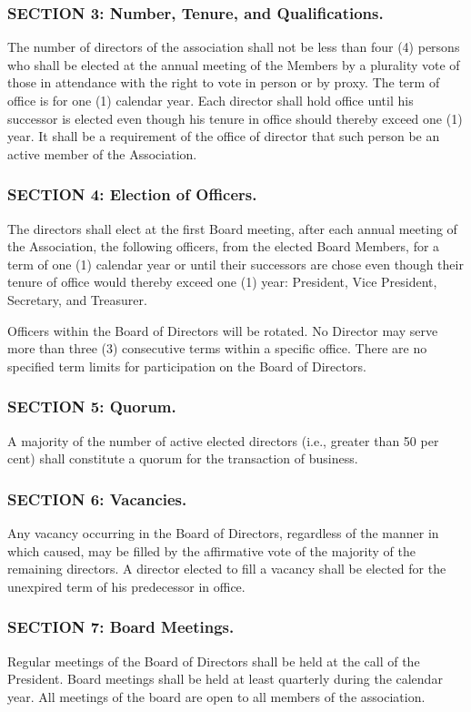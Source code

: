 \subsubsection{SECTION 3: Number, Tenure, and Qualifications.}
The number of directors of the association shall not be less than four
(4) persons who shall be elected at the annual meeting of the Members
by a plurality vote of those in attendance with the right to vote in
person or by proxy. The term of office is for one (1) calendar year. Each
director shall hold office until his successor is elected even though
his tenure in office should thereby exceed one (1) year. It shall be
a requirement of the office of director that such person be an active
member of the Association.

\subsubsection{SECTION 4: Election of Officers.}
The directors shall elect at the first Board meeting, after each annual
meeting of the Association, the following officers, from the elected Board
Members, for a term of one (1) calendar year or until their successors
are chose even though their tenure of office would thereby exceed one
(1) year: President, Vice President, Secretary, and Treasurer.

Officers within the Board of Directors will be rotated. No Director
may serve more than three (3) consecutive terms within a specific
office. There are no specified term limits for participation on the
Board of Directors.

\subsubsection{SECTION 5: Quorum.}
A majority of the number of active elected directors (i.e., greater than
50 per cent) shall constitute a quorum for the transaction of business.

\subsubsection{SECTION 6: Vacancies.}
Any vacancy occurring in the Board of Directors, regardless of the manner
in which caused, may be filled by the affirmative vote of the majority
of the remaining directors. A director elected to fill a vacancy shall
be elected for the unexpired term of his predecessor in office.

\subsubsection{SECTION 7: Board Meetings.}
Regular meetings of the Board of Directors shall be held at the call of
the President. Board meetings shall be held at least quarterly during
the calendar year. All meetings of the board are open to all members of
the association.

